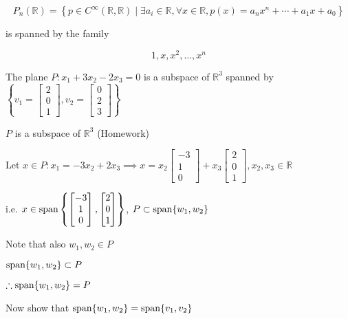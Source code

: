 \begin{example}
	\begin{equation} \label{eq:span-ex-2}
		P_n(\mathbb{R}) = \left\{p \in C^\infty(\mathbb{R}, \mathbb{R}) \mid \exists a_i \in \mathbb{R}, \forall x \in \mathbb{R}, p(x)=a_nx^n + \cdots + a_1 x + a_0\right\}
	\end{equation}

	is spanned by the family

	\[1, x, x^2, \ldots, x^n\]
\end{example}

\begin{example}
	The plane $P: x_1 + 3x_2 - 2x_3 = 0$ is a subspace of $\mathbb{R}^3$ spanned by $\left\{v_1=\begin{bmatrix}
		2\\0\\1
	\end{bmatrix}, v_2=\begin{bmatrix}
		0\\2\\3
	\end{bmatrix}\right\}$

	$P$ is a subspace of $\mathbb{R}^3$ (Homework)

	Let $x \in P: x_1 = -3x_2 + 2x_3 \implies x = x_2 \begin{bmatrix}
		-3\\1\\0
	\end{bmatrix} + x_3 \begin{bmatrix}
		2\\0\\1
	\end{bmatrix}, x_2, x_3 \in \mathbb{R}$

	i.e. $x \in \mathrm{span}\left\{\begin{bmatrix}
		-3\\1\\0
	\end{bmatrix}, \begin{bmatrix}
		2\\0\\1
	\end{bmatrix}\right\}$, $P \subset \mathrm{span}\{w_1, w_2\}$

	Note that also $w_1, w_2 \in P$

	$\mathrm{span}\{w_1, w_2\} \subset P$

	$\therefore \mathrm{span}\{w_1, w_2\} = P$

	\bigskip

	Now show that $\mathrm{span}\{w_1, w_2\} = \mathrm{span}\{v_1, v_2\}$


\end{example}
